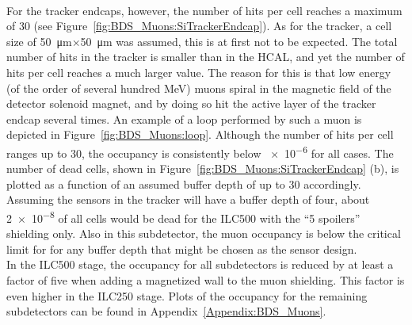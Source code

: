 \\For the \sid tracker endcaps, however, the number of hits per cell reaches a maximum of 30 (see Figure~\ref{fig:BDS_Muons:SiTrackerEndcap}).
As for the \sid tracker, a cell size of \SI{50}{\micro\meter}$\times$\SI{50}{\micro\meter} was assumed, this is at first not to be expected.
The total number of hits in the tracker is smaller than in the HCAL, and yet the number of hits per cell reaches a much larger value.
The reason for this is that low energy (of the order of several hundred MeV) muons spiral in the magnetic field of the detector solenoid magnet, and by doing so hit the active layer of the tracker endcap several times.
An example of a loop performed by such a muon is depicted in Figure~\ref{fig:BDS_Muons:loop}.
Although the number of hits per cell ranges up to 30, the occupancy is consistently below \num{e-6} for all cases.
The number of dead cells, shown in Figure~\ref{fig:BDS_Muons:SiTrackerEndcap} (b), is plotted as a function of an assumed buffer depth of up to 30 accordingly.
Assuming the sensors in the \sid tracker will have a buffer depth of four, about \num{2e-8} of all cells would be dead for the ILC500 with the ``5 spoilers'' shielding only.
Also in this subdetector, the muon occupancy is below the critical limit for \sid for any buffer depth that might be chosen as the sensor design.
\\In the ILC500 stage, the occupancy for all subdetectors is reduced by at least a factor of five when adding a magnetized wall to the muon shielding.
This factor is even higher in the ILC250 stage.
Plots of the occupancy for the remaining \sid subdetectors can be found in Appendix~\ref{Appendix:BDS_Muons}.
